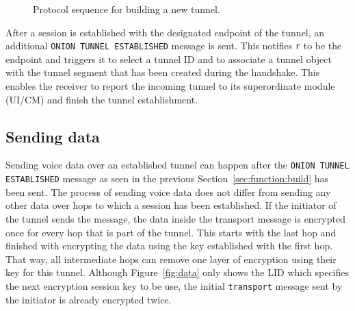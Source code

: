 \documentclass[paper=letter, fontsize=12pt]{article}
\begin{document}
\begin{figure}[ht]
    \vspace{5mm}
    \caption{Protocol sequence for building a new tunnel.}
    \label{fig:build}
\end{figure}

After a session is established with the designated endpoint of the tunnel, an additional \texttt{ONION TUNNEL ESTABLISHED} message is sent. This notifies \texttt{r} to be the endpoint and triggers it to select a tunnel ID and to associate a tunnel object with the tunnel segment that has been created during the handshake. This enables the receiver to report the incoming tunnel to its superordinate module (UI/CM) and finish the tunnel establishment.

\subsection{Sending data}
\label{sec:function:data}

Sending voice data over an established tunnel can happen after the \texttt{ONION TUNNEL ESTABLISHED} message as seen in the previous Section~\ref{sec:function:build} has been sent.
The process of sending voice data does not differ from sending any other data over hops to which a session has been established. If the initiator of the tunnel sends the message, the data inside the transport message is encrypted once for every hop that is part of the tunnel. This starts with the last hop and finished with encrypting the data using the key established with the first hop. That way, all intermediate hops can remove one layer of encryption using their key for this tunnel.
Although Figure~\ref{fig:data} only shows the LID which specifies the next encryption session key to be use, the initial \texttt{transport} message sent by the initiator is already encrypted twice.
\end{document}
